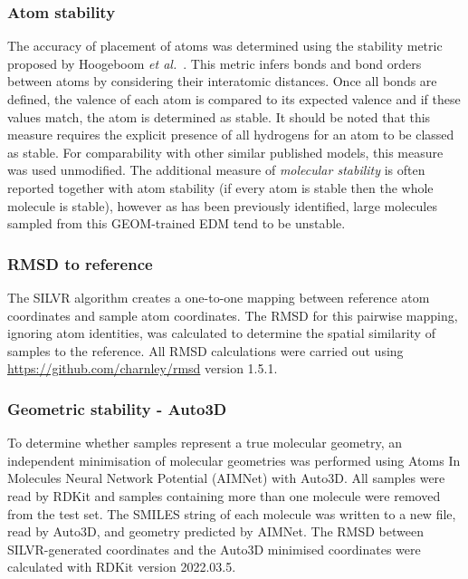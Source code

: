 \documentclass[journal=jacsat,manuscript=article]{achemso}
\begin{document}
\subsubsection{Atom stability}
The accuracy of placement of atoms was determined using the stability metric proposed by Hoogeboom \textit{et al.}~\cite{hoogeboom2022equivariant}. This metric infers bonds and bond orders between atoms by considering their interatomic distances. Once all bonds are defined, the valence of each atom is compared to its expected valence and if these values match, the atom is determined as stable. It should be noted that this measure requires the explicit presence of all hydrogens for an atom to be classed as stable. For comparability with other similar published models, this measure was used unmodified. The additional measure of \textit{molecular stability} is often reported together with atom stability (if every atom is stable then the whole molecule is stable), however as has been previously identified, large molecules sampled from this GEOM-trained EDM tend to be unstable.

\subsubsection{RMSD to reference}
The SILVR algorithm creates a one-to-one mapping between reference atom coordinates and sample atom coordinates. The RMSD for this pairwise mapping, ignoring atom identities, was calculated to determine the spatial similarity of samples to the reference. All RMSD calculations were carried out using \url{https://github.com/charnley/rmsd} version 1.5.1.

\subsubsection{Geometric stability - Auto3D}
To determine whether samples represent a true molecular geometry, an independent minimisation of molecular geometries was performed using Atoms In Molecules Neural Network Potential (AIMNet) with Auto3D. All samples were read by RDKit and samples containing more than one molecule were removed from the test set. The SMILES string of each molecule was written to a new file, read by Auto3D, and geometry predicted by AIMNet. The RMSD between SILVR-generated coordinates and the Auto3D minimised coordinates were calculated with RDKit version 2022.03.5.
\end{document}
